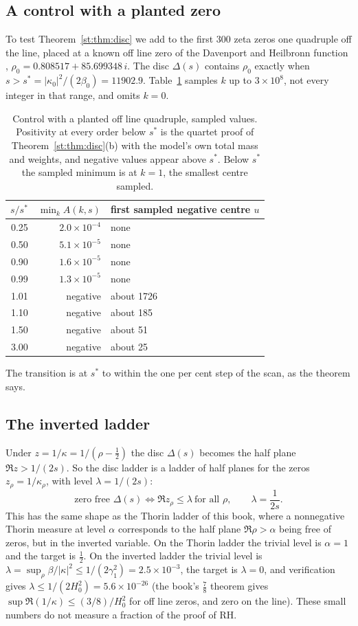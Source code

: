 \subsection{A control with a planted zero}
To test Theorem~\ref{st:thm:disc} we add to the first 300 zeta zeros one quadruple off the line, placed at a known off line zero of the Davenport and Heilbronn function \cite{DH36,BSO07}, $\rho_0=0.808517+85.699348\,i$. The disc $\Delta(s)$ contains $\rho_0$ exactly when $s>s^*=|\kappa_0|^2/(2\beta_0)=11902.9$. Table~\ref{st:tab:control} samples $k$ up to $3\times10^8$, not every integer in that range, and omits $k=0$.
\begin{table}[h]\centering\small
\begin{tabular}{rrl}
\toprule
$s/s^*$ & $\min_kA(k,s)$ & first sampled negative centre $u$\\
\midrule
0.25 & $2.0\times10^{-4}$ & none\\
0.50 & $5.1\times10^{-5}$ & none\\
0.90 & $1.6\times10^{-5}$ & none\\
0.99 & $1.3\times10^{-5}$ & none\\
1.01 & negative & about 1726\\
1.10 & negative & about 185\\
1.50 & negative & about 51\\
3.00 & negative & about 25\\
\bottomrule
\end{tabular}
\caption{Control with a planted off line quadruple, sampled values. Positivity at every order below $s^*$ is the quartet proof of Theorem~\ref{st:thm:disc}(b) with the model's own total mass and weights, and negative values appear above $s^*$. Below $s^*$ the sampled minimum is at $k=1$, the smallest centre sampled.}\label{st:tab:control}
\end{table}
The transition is at $s^*$ to within the one per cent step of the scan, as the theorem says.

\subsection{The inverted ladder}
Under $z=1/\kappa=1/(\rho-\tfrac12)$ the disc $\Delta(s)$ becomes the half plane $\Re z>1/(2s)$. So the disc ladder is a ladder of half planes for the zeros $z_\rho=1/\kappa_\rho$, with level $\lambda=1/(2s)$:
\[
\text{zero free }\Delta(s)\iff\Re z_\rho\le\lambda\ \text{for all }\rho,\qquad \lambda=\frac1{2s}.
\]
This has the same shape as the Thorin ladder of this book, where a nonnegative Thorin measure at level $\alpha$ corresponds to the half plane $\Re\rho>\alpha$ being free of zeros, but in the inverted variable. On the Thorin ladder the trivial level is $\alpha=1$ and the target is $\tfrac12$. On the inverted ladder the trivial level is $\lambda=\sup_\rho\beta/|\kappa|^2\le1/(2\gamma_1^2)=2.5\times10^{-3}$, the target is $\lambda=0$, and verification gives $\lambda\le1/(2H_0^2)=5.6\times10^{-26}$ (the book's $\tfrac78$ theorem gives $\sup\Re(1/\kappa)\le(3/8)/H_0^2$ for off line zeros, and zero on the line). These small numbers do not measure a fraction of the proof of RH.


